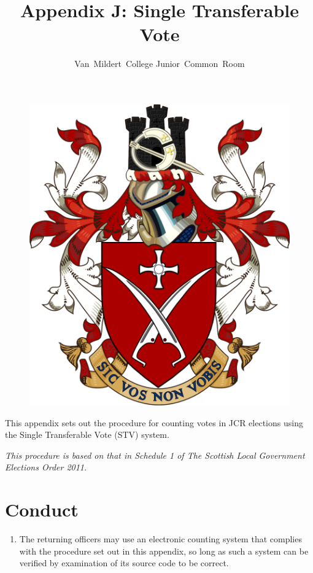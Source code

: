 \documentclass[12pt]{article}
\title{Appendix J: Single Transferable Vote}
\author{Van~Mildert~College Junior~Common~Room}
\date{\thedate}
\begin{document}
\begin{titlepage}  %
    \maketitle
    \begin{figure}[h]
        \includegraphics[scale=0.25]{arms}  %
        \centering
    \end{figure}
    \thispagestyle{empty}
\end{titlepage}
\setcounter{page}{2}  %
This appendix sets out the procedure for counting votes in JCR elections using the Single Transferable Vote (STV) system.

\emph{This procedure is based on that in Schedule 1 of The Scottish Local Government Elections Order 2011.}

\section{Conduct}
\begin{enumerate}
    \item The returning officers may use an electronic counting system that complies with the procedure set out in this appendix, so long as such a system can be verified by examination of its source code to be correct.
\end{enumerate}
\end{document}
